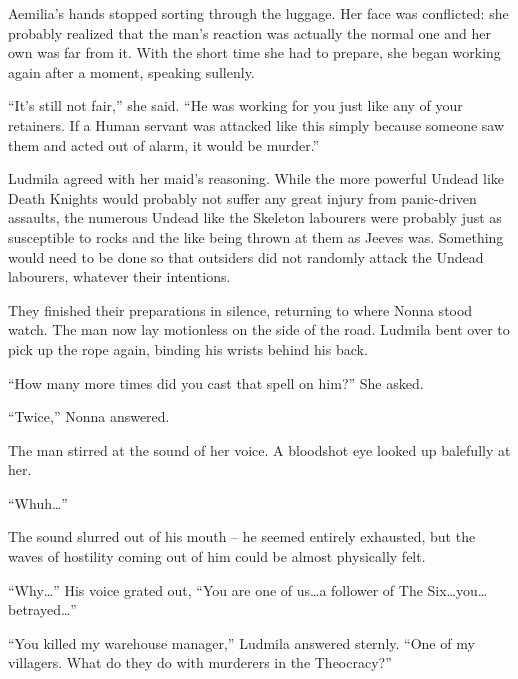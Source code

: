  

Aemilia’s hands stopped sorting through the luggage. Her face was conflicted: she probably realized that the man’s reaction was actually the normal one and her own was far from it. With the short time she had to prepare, she began working again after a moment, speaking sullenly.

 

“It’s still not fair,” she said. “He was working for you just like any of your retainers. If a Human servant was attacked like this simply because someone saw them and acted out of alarm, it would be murder.”

 

Ludmila agreed with her maid’s reasoning. While the more powerful Undead like Death Knights would probably not suffer any great injury from panic-driven assaults, the numerous Undead like the Skeleton labourers were probably just as susceptible to rocks and the like being thrown at them as Jeeves was. Something would need to be done so that outsiders did not randomly attack the Undead labourers, whatever their intentions.

 

They finished their preparations in silence, returning to where Nonna stood watch. The man now lay motionless on the side of the road. Ludmila bent over to pick up the rope again, binding his wrists behind his back.

 

“How many more times did you cast that spell on him?” She asked.

 

“Twice,” Nonna answered.

 

The man stirred at the sound of her voice. A bloodshot eye looked up balefully at her.

 

“Whuh…”

 

The sound slurred out of his mouth – he seemed entirely exhausted, but the waves of hostility coming out of him could be almost physically felt.

 

“Why…” His voice grated out, “You are one of us…a follower of The Six…you…betrayed…”

 

“You killed my warehouse manager,” Ludmila answered sternly. “One of my villagers. What do they do with murderers in the Theocracy?”

